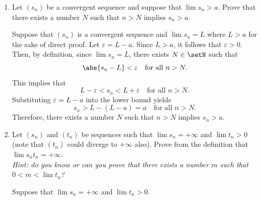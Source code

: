 \begin{enumerate}
\begin{enumerate}
\begin{subprove}
\[      \]
      Therefore, by , \(\lim s_n = s\).
      Hence,  is proved.
    \end{subprove}
    \item Suppose that \(\abs{s_n} \leq t_n\) for all \(n\) and \(\lim t_n = 0\). 
    Prove that \(\lim s_n = 0\).
    \begin{subprove}
      Suppose that \(\abs{s_n} \leq t_n\) for all \(n \in \setN\) and \(\lim t_n = 0\) for the sake of direct proof.
      Since \(0 \leq \abs{s_n} \leq t_n\), the terms \(t_n\) are non-negative for all \(n\).
      Let \(\varepsilon > 0\) be given. Then, by definition, since \(\lim t_n = 0\),
      there exists \(N \in \setN\) such that
      \[
        \abs{t_n - 0} = \abs{t_n} = t_n < \varepsilon \quad\text{for all } n > N.
      \]
      Since \(\abs{s_n} \leq t_n\) for all \(n \in \setN\), it follows that
      \[
        \abs{s_n - 0} = \abs{s_n} \leq t_n < \varepsilon \quad\text{for all } n > N.
      \]
      Therefore, by definition, \(\lim s_n = 0\).
    \end{subprove}
  \end{enumerate}



  \newpage
  \item \label{prob:limit-inequality} Let \((s_n)\) be a convergent sequence and suppose that 
  \(\lim s_n > a\). Prove that there exists a number \(N\) such that 
  \(n > N\) implies \(s_n > a\).
  \begin{subprove}
    Suppose that \((s_n)\) is a convergent sequence and \(\lim s_n = L\) where \(L > a\)
    for the sake of direct proof.
    Let \(\varepsilon = L - a\). Since \(L > a\), it follows that \(\varepsilon > 0\).
    Then, by definition, since \(\lim s_n = L\),
    there exists \(N \in \setN\) such that
    \[
      \abs{s_n - L} < \varepsilon \quad\text{for all } n > N.
    \]
    This implies that
    \[
      L - \varepsilon < s_n < L + \varepsilon \quad\text{for all } n > N.
    \]
    Substituting \(\varepsilon = L - a\) into the lower bound yields
    \[
      s_n > L - (L - a) = a \quad\text{for all } n > N.
    \]
    Therefore, there exists a number \(N\) such that \(n > N\) implies \(s_n > a\).
  \end{subprove}

  \item Let \((s_n)\) and \((t_n)\) be sequences such that 
  \(\lim s_n = +\infty\) and \(\lim t_n > 0\) (note that \((t_n)\) 
  could diverge to \(+\infty\) also). Prove from the definition 
  that \(\lim s_n t_n = +\infty\). \\
  \textit{Hint: do you know or can you prove that there 
  exists a number \(m\) such that \(0 < m < \lim t_n\)?}\begin{subprove}
    Suppose that \(\lim s_n = +\infty\) and \(\lim t_n > 0\). 
    

\end{subprove}
\end{enumerate}
